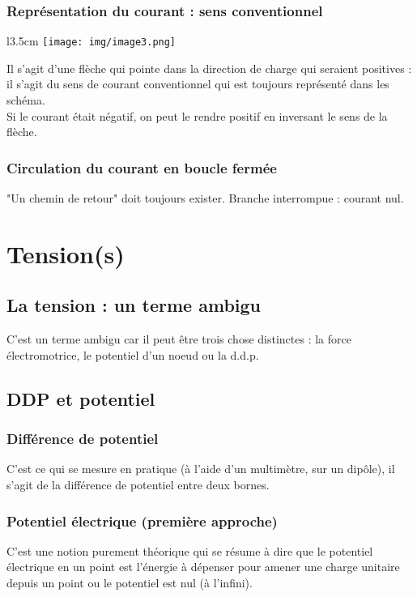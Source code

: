 \documentclass	[11pt, a4paper, openany]{book}
\begin{document}
\subsubsection{Représentation du courant : sens conventionnel}
\begin{wrapfigure}[5]{l}{3.5cm}
\texttt{[image: img/image3.png]}
\end{wrapfigure}
Il s'agit d'une flèche qui pointe dans la direction de charge qui seraient positives : il s'agit du sens de courant conventionnel qui est toujours représenté dans les schéma.\\
Si le courant était négatif, on peut le rendre positif en inversant le sens de la flèche.

\subsubsection{Circulation du courant en boucle fermée}
"Un chemin de retour" doit toujours exister. Branche interrompue : courant nul.

\section{Tension(s)}
\subsection{La tension : un terme ambigu}
C'est un terme ambigu car il peut être trois chose distinctes : la force électromotrice, le potentiel d'un noeud ou la d.d.p.

\subsection{DDP et potentiel}
\subsubsection{Différence de potentiel}
C'est ce qui se mesure en pratique (à l'aide d'un multimètre, sur un dipôle), il s'agit de la différence de potentiel entre deux bornes.

\subsubsection{Potentiel électrique (première approche)}
C'est une notion purement théorique qui se résume à dire que le potentiel électrique en un point est l'énergie à dépenser pour amener une charge unitaire depuis un point ou le potentiel est nul (à l'infini).
\end{document}

